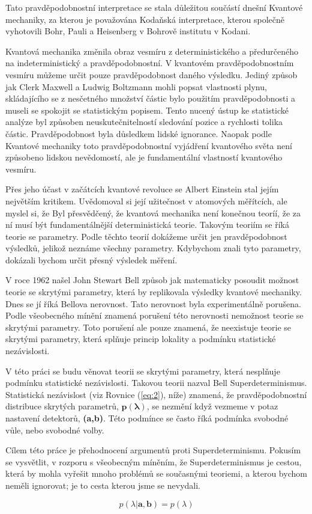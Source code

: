 Tato pravděpodobnostní interpretace se stala důležitou součástí dnešní Kvantové mechaniky, za kterou je považována Kodaňská interpretace, kterou společně vyhotovili Bohr, Pauli a Heisenberg v Bohrově institutu v Kodani.

Kvantová mechanika změnila obraz vesmíru z deterministického a předurčeného na indeterministický a pravděpodobnostní. V kvantovém pravděpodobnostním vesmíru můžeme určit pouze pravděpodobnost daného výsledku. Jediný způsob jak Clerk Maxwell a Ludwig Boltzmann mohli popsat vlastnosti plynu, skládajícího se z nesčetného množství částic bylo použitím pravděpodob\-nosti a museli se spokojit se statistickým popisem. Tento nucený ústup ke statistické analýze byl způsoben neuskutečnitelností sledování pozice a rychlosti tolika částic. Pravděpodob\-nost byla důsledkem lidské ignorance. Naopak podle Kvantové mechaniky toto pravděpodobnost\-ní vyjádření kvantového světa není způsobeno lidskou nevědomostí, ale je fundamentální vlastností kvantového vesmíru.

Přes jeho účast v začátcích kvantové revoluce se Albert Einstein stal jejím největším kritikem. Uvědomoval si její užitečnost v atomových měřítcích, ale myslel si, že  Byl přesvědčený, že kvantová mechanika není konečnou teoríí, že za ní musí být fundamentálnější deterministická teorie. Takovým teoriím se říká teorie se  parametry. Podle těchto teorií dokážeme určit jen pravděpodobnost výsledků, jelikož neznáme všechny parametry. Kdybychom znali tyto  parametry, dokázali bychom určit přesný výsledek měření.

V roce 1962 našel John Stewart Bell způsob jak matematicky posoudit možnost teorie se skrytými parametry, která by replikovala výsledky kvantové mechaniky. Dnes se jí říká Bellova nerovnost. Tato nerovnost byla experimentálně porušena. Podle všeobecného mínění znamená porušení této nerovnosti nemožnost teorie se skrytými parametry. Toto porušení ale pouze znamená, že neexistuje teorie se skrytými parametry, která splňuje princip lokality a podmínku statistické nezávislosti.

V této práci se budu věnovat teorii se skrytými parametry, která nesplňuje podmínku statistické nezávislosti. Takovou teorii nazval Bell Superdeterminismus. Statistická nezávislost (viz Rovnice (\ref{eq:2}), níže) znamená, že pravděpodobnostní distribuce skrytých parametrů, $\bm{p(\lambda)}$, se nezmění když vezmeme v potaz nastavení detektorů, \textbf{(a,b)}. Této podmínce se často říká podmín\-ka svobodné vůle, nebo svobodné volby. 

Cílem této práce je přehodnocení argumentů proti Superdeterminismu. Pokusím se vysvětlit, v rozporu s všeobecným míněním, že Superdeterminismus je cestou, která by mohla vyřešit mnoho problémů se současnými teoriemi, a kterou bychom neměli ignorovat; je to cesta kterou jsme se nevydali.

\begin{equation}
    p(\lambda|\bm{a},\bm{b}) = p(\lambda) 
    \label{eq:2}
\end{equation}


